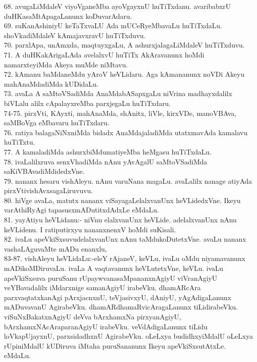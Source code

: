 \documentclass{article}
\begin{document}
68. avugaLiMdaleV viyoVganeMba ayoVgayxnU huTiTxdanu. avaribabxrU duHKasaMtApagaLanunx koDuvarAdaru.\\
69. suKanAshiniyU keTaTxvaLU Ada mUCeRyeMbavaLu huTiTxdaLu. shoVkadiMdaleV kAmajavxravU huTiTxduvu.\\
70. parxlApa, unAmxda, maqtuyxgaLu, A ashurxjalagaLiMdaleV huTiTxduvu.\\
71. A duHKakArigaLAda avelalxvU huTiTx AkAravanunx hoMdi namarxteyiMda Akeya muMde niMtavu.\\
72. kAmanu baMdaneMdu yAroV heVLidaru. Aga kAmananunx noVDi Akeyu mahAnaMdadiMda kUDidaLu.\\
73. avaLa A saMtoVSadiMda AnaMdabASapxgaLu niVrina madhayxdalilx biVLalu alilx cApalayxreMba parxjegaLu huTiTxdaru.\\
74-75. pirxVti, KAyxti, mahAnaMda, shAnitx, liVle, kirxVDe, manoVBAva, saMBoVga eMbavaru huTiTxdaru.\\
76. ratiya balagaNiNxniMda bidadx AnaMdajaladiMda utatxmavAda kamalavu huTiTxtu.\\
77. A kamaladiMda ashurxbiMdumatiyeMba heMgasu huTiTxdaLu.\\
78. ivaLalilxruva senxVhadiMda nAnu yAvAgalU saMtoVSadiMda saKiVBAvadiMdidedxVne.\\
79. nananx hesaru vishAleyu. nAnu varuNana magaLu. avaLalilx nanage atiyAda pirxVtivishAvxsagaLiruvuvu.\\
80. hiVge avaLa, matutx nananx viSayagaLelalxvanUnx heVLidedxVne. Ikeyu varAthiRyAgi tapasusxmADutitxdAdxLe eMdaLu.\\
81. yayAtiyu heVLidanu:- niVnu elalxvanUnx heVLide. adelalxvanUnx nAnu keVLidenu. I ratiputirxyu nananxnenxV hoMdi suKisali.\\
82. ivaLu apeVkiSxsuvudelalxvanUnx nAnu taMdukoDutetxVne. avaLu nananx vashaLAguvaMte mADu enanxlu,\\
83-87. vishAleyu heVLidaLu:-eleY rAjaneV, keVLu, ivaLu oMdu niyamavanunx mADikoMDiruvaLu. ivaLa A vaqtavanunx heVLutetxVne, keVLu. ivaLu apeVkiSxsuva puruSanu rUpaywvanasaMpananxnAgiyU viVranAgiyU veYBavadalilx iMdarxnige samanAgiyU irabeVku. dhamARcAra parxvaqtatxkanAgi pArxjacnxnU, teVjasivxyU, dAniyU, yAgAdigaLanunx mADuvavanU AgirabeVku. dhamARdhamaRvicAragaLanunx tiLidirabeVku. viSuNxBakatxnAgiyU deVva bArxhamxNa pirxyanAgiyU, bArxhamxNAcAraparanAgiyU irabeVku. veVdAdigaLanunx tiLidu loVkapUjayxnU, parxsidadhxnU AgirabeVku. oLeLxya budidhxyiMdalU oLeLxya rUpiniMdalU kUDiruva iMtaha puruSananunx Ikeyu apeVkiSxsutAtxLe. eMdaLu.\\
\end{document}
